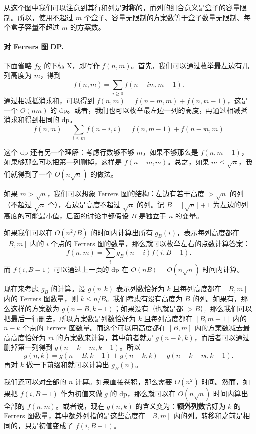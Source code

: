     从这个图中我们可以注意到其行和列是\textbf{对称}的，而列的组合意义是盒子的容量限制。所以，使用不超过 $m$ 个盒子、容量无限制的方案数等于盒子数量无限制、每个盒子容量不超过 $m$ 的方案数。

    \paragraph{对 Ferrers 图 DP. }
        下面省略 $f_{\mathrm{X}}$ 的下标 X，即写作 $f(n,m)$。首先，我们可以通过枚举最左边有几列高度为 $m$，得到
        $$
        f(n,m)=\sum_{i\ge 0}f(n-im,m-1).
        $$ 
        通过相减抵消求和，可以得到 $f(n,m)=f(n-m,m)+f(n,m-1)$，这是一个 $O(nm)$ 的 dp。或者，我们也可以枚举最左边一列的高度，再通过相减抵消求和得到相同的 dp。
        $$
        f(n,m)=\sum_{i\le m}f(n-i,i)=f(n,m-1)+f(n-m,m)
        $$

        这个 dp 还有另一个理解：考虑行数够不够 $m$，如果不够那么是 $f(n,m-1)$，如果够那么可以把第一列删掉，这样是 $f(n-m,m)$。总之，如果 $m\le \sqrt{n}$，我们就得到了一个 $O(n\sqrt{n})$ 的做法。

        如果 $m>\sqrt{n}$，我们可以想象 Ferrers 图的结构：左边有若干高度 $>\sqrt{n}$ 的列（不超过 $\sqrt{n}$ 个），右边是高度不超过 $\sqrt{n}$ 的列。记 $B=\lfloor \sqrt{n}\rfloor+1$ 为左边的列高度的可能最小值，后面的讨论中都假设 $B$ 是独立于 $n$ 的变量。
        
        如果我们可以在 $O(n^2/B)$ 的时间内计算出所有 $g_B(i)$，表示每列高度都在 $[B,m]$ 内的 $i$ 个点的 Ferrers 图的数量，那么就可以枚举左右的点数计算答案：
        $$
        f(n,m)=\sum_{i}g_B(n-i)f(i,B-1).
        $$      
        而 $f(i,B-1)$ 可以通过上一页的 dp 在 $O(nB)=O(n\sqrt{n})$ 时间内计算。

        现在来考虑 $g_B$ 的计算。设 $g(n,k)$ 表示列数恰好为 $k$ 且每列高度都在 $[B,m]$ 内的 Ferrers 图数量，则 $k\le n/B$。我们考虑有没有高度为 $B$ 的列。如果有，那么这样的方案数为 $g(n-B,k-1)$；如果没有（也就是都 $>B$），那么我们可以把最后一行删去，所以方案数是列数恰好为 $k$ 且每列高度都在 $[B,m-1]$ 内的 $n-k$ 个点的 Ferrers 图数量。而这个可以用高度都在 $[B,m]$ 内的方案数减去最高高度恰好为 $m$ 的方案数来计算，其中前者就是 $g(n-k,k)$，而后者可以通过删掉第一列得到 $g(n-k-m,k-1)$。所以
        $$
        g(n,k)=g(n-B,k-1)+g(n-k,k)-g(n-k-m,k-1).
        $$ 
        再对 $k$ 做一下前缀和就可以计算出 $g_B(n)$。

        我们还可以对全部的 $n$ 计算。如果直接卷积，那么需要 $O(n^2)$ 时间。然而，如果把 $f(i,B-1)$ 作为初值来做 $g$ 的 dp，那么就可以在 $O(n\sqrt{n})$ 时间内算出全部的 $f(n,m)$。或者说，现在 $g(n,k)$ 的含义变为：\textbf{额外列数}恰好为 $k$ 的 Ferrers 图数量，其中额外列指的是这些高度在 $[B,m]$ 内的列。转移和之前是相同的，只是初值变成了 $f(i,B-1)$。

